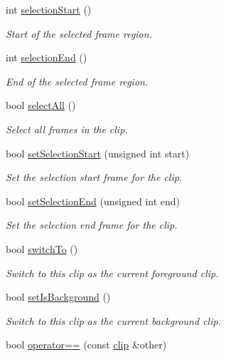 \begin{DoxyCompactItemize}
int \hyperlink{classlives_1_1clip_ae3bec5d06c36693307baab2f0ae2c591}{selection\-Start} ()
\begin{DoxyCompactList}\small\item\em Start of the selected frame region. \end{DoxyCompactList}\item 
int \hyperlink{classlives_1_1clip_a4e2b3c1a80795906f39f27390b8545ae}{selection\-End} ()
\begin{DoxyCompactList}\small\item\em End of the selected frame region. \end{DoxyCompactList}\item 
bool \hyperlink{classlives_1_1clip_ac06a024a56ba4b3e32a090d942fb71fd}{select\-All} ()
\begin{DoxyCompactList}\small\item\em Select all frames in the clip. \end{DoxyCompactList}\item 
bool \hyperlink{classlives_1_1clip_a01d1d840575c077e8c44ebe71df4ef82}{set\-Selection\-Start} (unsigned int start)
\begin{DoxyCompactList}\small\item\em Set the selection start frame for the clip. \end{DoxyCompactList}\item 
bool \hyperlink{classlives_1_1clip_abb198e92872582f71ce178e0a0c4c9ac}{set\-Selection\-End} (unsigned int end)
\begin{DoxyCompactList}\small\item\em Set the selection end frame for the clip. \end{DoxyCompactList}\item 
bool \hyperlink{classlives_1_1clip_aa809f02996c2c676934883ad14918b1b}{switch\-To} ()
\begin{DoxyCompactList}\small\item\em Switch to this clip as the current foreground clip. \end{DoxyCompactList}\item 
bool \hyperlink{classlives_1_1clip_a3f8614e13193d38a584dafe82a828361}{set\-Is\-Background} ()
\begin{DoxyCompactList}\small\item\em Switch to this clip as the current background clip. \end{DoxyCompactList}\item 
bool \hyperlink{classlives_1_1clip_ad4721076828112e5adfa44dca7d54a02}{operator==} (const \hyperlink{classlives_1_1clip}{clip} \&other)
\end{DoxyCompactItemize}
